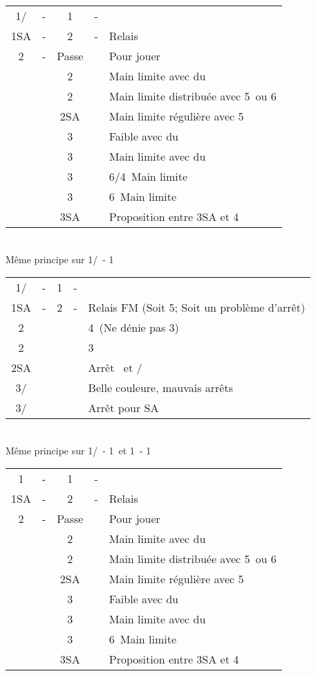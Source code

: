 \documentclass[a4paper, oneside, 11pt]{report}
\begin{document}
	\begin{tabular}{cccc|l}
	1\trefle/\carreau & - & 1\pique & - &\\
	1SA & - & 2\trefle & - & Relais\\
	2\carreau & - & Passe && Pour jouer\\
	&& 2\coeur && Main limite avec du \trefle\\
	&& 2\pique && Main limite distribuée avec 5\pique\ ou 6\pique\\
	&& 2SA && Main limite régulière avec 5\pique\\
	&& 3\trefle && Faible avec du \trefle\\
	&& 3\carreau && Main limite avec du \carreau\\
	&& 3\coeur && 6\pique/4\coeur\ Main limite\\
	&& 3\pique && 6\pique\ Main limite\\
	&& 3SA && Proposition entre 3SA et 4\pique\\
	\end{tabular}\\
	Même principe sur 1\trefle/\carreau\ - 1\coeur\\

	\begin{tabular}{cccc|l}
	1\trefle/\carreau & - & 1\pique & - &\\
	1SA & - & 2\carreau & - & Relais FM (Soit 5\pique ; Soit un problème d'arrêt)\\
	2\coeur &&&& 4\coeur\ (Ne dénie pas 3\pique)\\
	2\pique &&&& 3\pique\\
	2SA &&&& Arrêt \coeur\ et \carreau/\trefle\\
	3\trefle/\carreau &&&& Belle couleure, mauvais arrêts\\
	3\carreau/\trefle &&&& Arrêt pour SA\\
	\end{tabular}\\
	Même principe sur 1\trefle/\carreau\ - 1\coeur\ et 1\coeur\ - 1\pique\\

	\begin{tabular}{cccc|l}
	1\coeur & - & 1\pique & - &\\
	1SA & - & 2\trefle & - & Relais\\
	2\carreau & - & Passe && Pour jouer\\
	&& 2\coeur && Main limite avec du \trefle\\
	&& 2\pique && Main limite distribuée avec 5\pique\ ou 6\pique\\
	&& 2SA && Main limite régulière avec 5\pique\\
	&& 3\trefle && Faible avec du \trefle\\
	&& 3\carreau && Main limite avec du \carreau\\
	&& 3\pique && 6\pique\ Main limite\\
	&& 3SA && Proposition entre 3SA et 4\pique\\
	\end{tabular}\\\\
	
\end{document}
